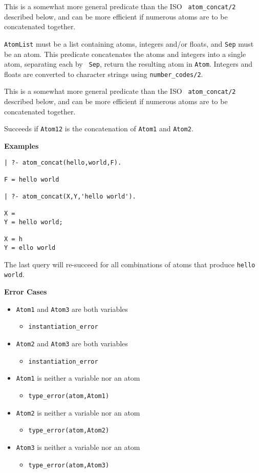 \begin{description}
This is a somewhat more general predicate than the ISO {\tt
  atom\_concat/2} described below, and can be more efficient if
numerous atoms are to be concatenated together.


{\tt AtomList} must be a list containing atoms, integers and/or
floats, and {\tt Sep} must be an atom.  This predicate concatenates
the atoms and integers into a single atom, separating each by {\tt
Sep}, return the resulting atom in {\tt Atom}.  Integers and floats
are converted to character strings using {\tt number\_codes/2}.

This is a somewhat more general predicate than the ISO {\tt
  atom\_concat/2} described below, and can be more efficient if
numerous atoms are to be concatenated together.

%
Succeeds if {\tt Atom12} is the concatenation of {\tt Atom1} and {\tt Atom2}.

{\bf Examples}
{\small
\begin{verbatim}
| ?- atom_concat(hello,world,F).

F = hello world

| ?- atom_concat(X,Y,'hello world').

X =
Y = hello world;

X = h
Y = ello world 
\end{verbatim}
}
The last query will re-succeed for all combinations of atoms that
produce {\tt hello world}.

{\bf Error Cases}
\begin{itemize}
  \item {\tt Atom1} and {\tt Atom3} are both variables
\begin{itemize}
\item {\tt instantiation\_error}
\end{itemize}
  \item {\tt Atom2} and {\tt Atom3} are both variables
\begin{itemize}
\item {\tt instantiation\_error}
\end{itemize}
\item {\tt Atom1} is neither a variable nor an atom
\begin{itemize}      
\item   {\tt type\_error(atom,Atom1)}
\end{itemize}
\item {\tt Atom2} is neither a variable nor an atom
\begin{itemize}      
\item   {\tt type\_error(atom,Atom2)}
\end{itemize}
\item {\tt Atom3} is neither a variable nor an atom
\begin{itemize}      
\item   {\tt type\_error(atom,Atom3)}
\end{itemize}
\end{itemize}


\end{description}
